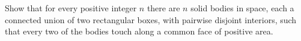 Show that for every positive integer $n$ there are $n$ solid bodies in space, each a connected union of two rectangular boxes, with pairwise disjoint interiors, such that every two of the bodies touch along a common face of positive area.
